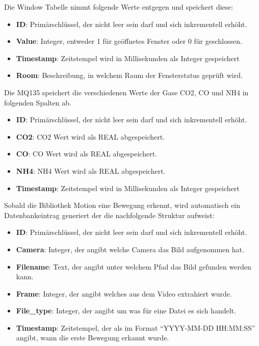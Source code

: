 Die Window Tabelle nimmt folgende Werte entgegen und speichert diese:
\begin{itemize}
	\item \textbf{ID}: Primärschlüssel, der nicht leer sein darf und sich inkrementell erhöht.  
	\item \textbf{Value}: Integer, entweder 1 für geöffnetes Fenster oder 0 für geschlossen.
	\item \textbf{Timestamp}: Zeitstempel wird in Millisekunden als Integer gespeichert
	\item \textbf{Room}: Beschreibung, in welchem Raum der Fensterstatus geprüft wird. 
\end{itemize}

Die MQ135 speichert die verschiedenen Werte der Gase CO2, CO und NH4 in folgenden Spalten ab.
\begin{itemize}
	\item \textbf{ID}: Primärschlüssel, der nicht leer sein darf und sich inkrementell erhöht.  
	\item \textbf{CO2}: CO2 Wert wird als REAL abgespeichert.
	\item \textbf{CO}: CO Wert wird als REAL abgespeichert.
	\item \textbf{NH4}: NH4 Wert wird als REAL abgespeichert. 
	\item \textbf{Timestamp}: Zeitstempel wird in Millisekunden als Integer gespeichert
\end{itemize}

Sobald die Bibliothek Motion eine Bewegung erkennt, wird automatisch ein Datenbankeintrag generiert der die nachfolgende Struktur aufweist:
\begin{itemize}
	\item \textbf{ID}: Primärschlüssel, der nicht leer sein darf und sich inkrementell erhöht.  
	\item \textbf{Camera}: Integer, der angibt welche Camera das Bild aufgenommen hat.
	\item \textbf{Filename}: Text, der angibt unter welchem Pfad das Bild gefunden werden kann.
	\item \textbf{Frame}: Integer, der angibt welches aus dem Video extrahiert wurde. 
	\item \textbf{File\_type}: Integer, der angibt um was für eine Datei es sich handelt.
	\item \textbf{Timestamp}: Zeitstempel, der als im Format \enquote{YYYY-MM-DD HH:MM:SS} angibt, wann die erste Bewegung erkannt wurde.	
\end{itemize}


